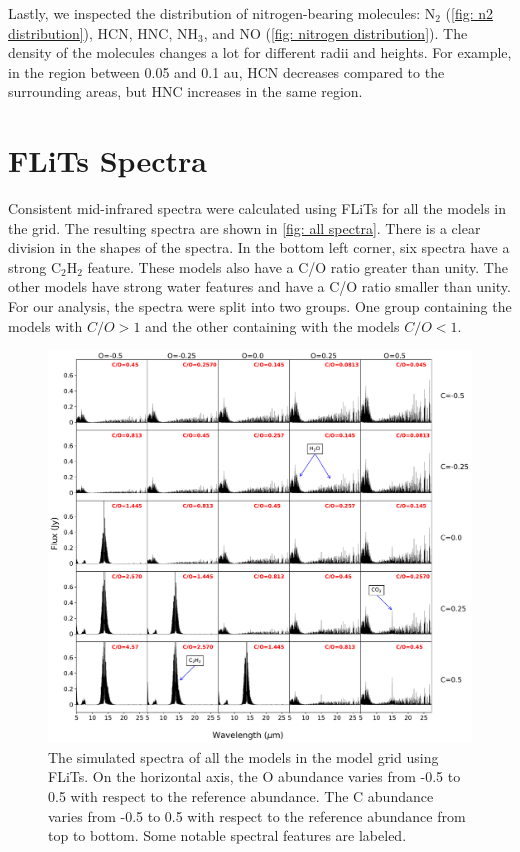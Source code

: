 \documentclass[oneside, single, authoryear, semicolon, 12pt]{lion-msc}
\newcommand{\4}{$_4$}
\newcommand{\3}{$_3$}
\newcommand{\2}{$_2$}
\begin{document}
Lastly, we inspected the distribution of nitrogen-bearing molecules: N\2 (\autoref{fig: n2 distribution}), HCN, HNC, NH\3, and NO (\autoref{fig: nitrogen distribution}). The density of the molecules changes a lot for different radii and heights. For example, in the region between 0.05 and 0.1 au, HCN decreases compared to the surrounding areas, but HNC increases in the same region.
\newpage
\section{FLiTs Spectra}
Consistent mid-infrared spectra were calculated using FLiTs for all the models in the grid. The resulting spectra are shown in \autoref{fig: all spectra}. There is a clear division in the shapes of the spectra. In the bottom left corner, six spectra have a strong C\2H\2 feature. These models also have a C/O ratio greater than unity. The other models have strong water features and have a C/O ratio smaller than unity. For our analysis, the spectra were split into two groups. One group containing the models with $C/O>1$ and the other containing with the models $C/O<1$.

\begin{figure}[H]
    \centering
    \includegraphics[width=0.9\linewidth]{Figures/All_spectra.pdf}
    \caption{The simulated spectra of all the models in the model grid using FLiTs. On the horizontal axis, the O abundance varies from -0.5 to 0.5 with respect to the reference abundance. The C abundance varies from -0.5 to 0.5 with respect to the reference abundance from top to bottom. Some notable spectral features are labeled.}
    \label{fig: all spectra}
\end{figure}
\end{document}
